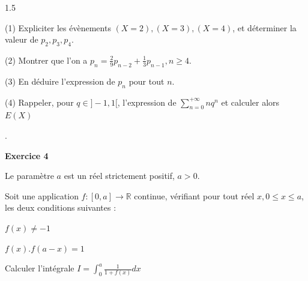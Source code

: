 \documentclass[12pt]{article}
\begin{document}
\begin{spacing}{1.5}
{(1) Expliciter les évènements $(X = 2), (X = 3), (X = 4)$, et déterminer la valeur de $p_2,
 p_3, p_4$.

(2) Montrer que l'on a $p_n = \frac{2}{9}p_{n-2}+\frac{1}{3}p_{n-1}, n\geq 4.$
 
 (3) En déduire l'expression de $p_n$ pour tout $n$.
 
 (4) Rappeler, pour $q \in ]-1,1[$, l'expression de       
$\sum_{n=0}^{+\infty}nq^n$ et calculer alors $E(X)$}.

\medskip\textbf{Exercice 4}

Le paramètre $a$ est un réel strictement positif, $a > 0$. 

Soit une application $f : [0,a]\longrightarrow \mathbb{R}$ continue, vérifiant pour tout réel $x, 0 \leq x \leq a$, les deux conditions suivantes : 

$f(x)\neq -1$

$f(x).f(a-x)=1$

 Calculer l'intégrale $I = \int_{0}^{a}\frac{1}{1+f(x)}dx$

\quad
\quad

\end{spacing}
\end{document}
